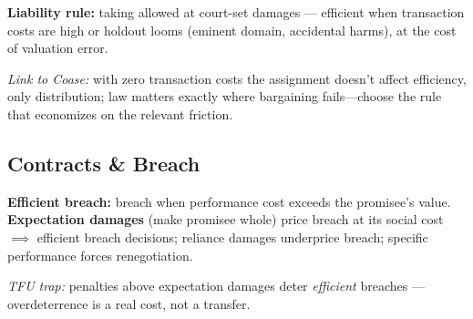 \textbf{Liability rule:} taking allowed at court-set damages --- efficient when transaction costs are high or holdout looms (eminent domain, accidental harms), at the cost of valuation error.

\textit{Link to Coase:} with zero transaction costs the assignment doesn't affect efficiency, only distribution; law matters exactly where bargaining fails---choose the rule that economizes on the relevant friction.

\subsection{Contracts \& Breach}
\textbf{Efficient breach:} breach when performance cost exceeds the promisee's value. \textbf{Expectation damages} (make promisee whole) price breach at its social cost $\implies$ efficient breach decisions; reliance damages underprice breach; specific performance forces renegotiation.

\textit{TFU trap:} penalties above expectation damages deter \textit{efficient} breaches --- overdeterrence is a real cost, not a transfer.
